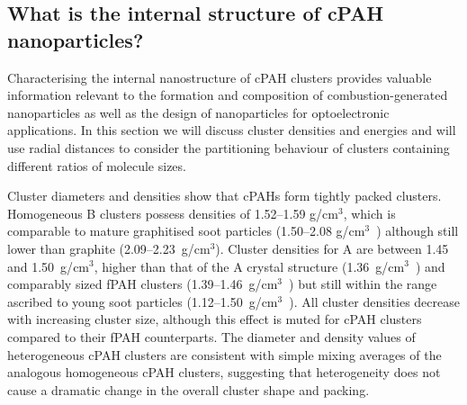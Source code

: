 
\subsection{What is the internal structure of cPAH nanoparticles?}
Characterising the internal nanostructure of cPAH clusters provides valuable information relevant to the formation and composition of combustion-generated nanoparticles as well as the design of nanoparticles for optoelectronic applications. In this section we will discuss cluster densities and energies and will use radial distances to consider the partitioning behaviour of clusters containing different ratios of molecule sizes.

Cluster diameters and densities show that cPAHs form tightly packed clusters. Homogeneous B clusters possess densities of 1.52--1.59 g/$\text{cm}^{3}$, which is comparable to mature graphitised soot particles (1.50--2.08 g/$\text{cm}^{3}$~\cite{johansson2017evolution}) although still lower than graphite (2.09--2.23~g/$\text{cm}^{3}$). Cluster densities for A are between 1.45 and 1.50~g/$\text{cm}^{3}$, higher than that of the A crystal structure (1.36~g/$\text{cm}^{3}$~\cite{Petrukhina2005}) and comparably sized fPAH clusters (1.39--1.46~g/$\text{cm}^{3}$~\cite{chen2014size}) but still within the range ascribed to young soot particles (1.12--1.50~g/$\text{cm}^{3}$~\cite{totton2010modelling,camacho2015mobility}). All cluster densities decrease with increasing cluster size, although this effect is muted for cPAH clusters compared to their fPAH counterparts. The diameter and density values of heterogeneous cPAH clusters are consistent with simple mixing averages of the analogous homogeneous cPAH clusters, suggesting that heterogeneity does not cause a dramatic change in the overall cluster shape and packing.

